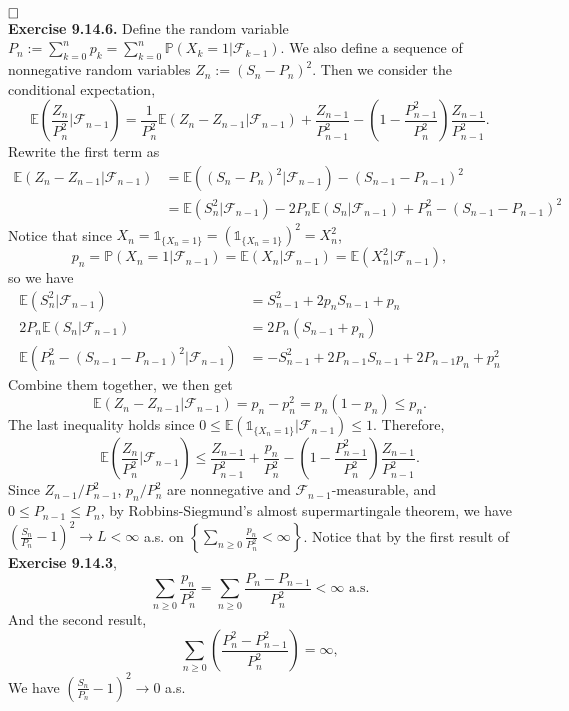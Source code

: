 \documentclass[12pt]{extarticle}
\begin{document}
$\hspace{\fill}\square$
\\
\textbf{Exercise 9.14.6.} 
Define the random variable $P_n:=\sum_{k=0}^np_k=\sum_{k=0}^n\mathbb{P}(X_k=1|\mathcal{F}_{k-1})$.
We also define a sequence of nonnegative random variables $Z_n:=(S_n-P_n)^2$.
Then we consider the conditional expectation, 
\[
\mathbb{E}\left(\frac{Z_n}{P_n^2}\bigg|\mathcal{F}_{n-1}\right)
=
\frac{1}{P_n^2}\mathbb{E}(Z_n-Z_{n-1}|\mathcal{F}_{n-1})
+
\frac{Z_{n-1}}{P_{n-1}^2}
-
\left(1-\frac{P_{n-1}^2}{P_n^2}\right)\frac{Z_{n-1}}{P_{n-1}^2}.
\]
Rewrite the first term as
\[
\begin{aligned}
\mathbb{E}(Z_n-Z_{n-1}|\mathcal{F}_{n-1})
&=
\mathbb{E}\left((S_n-P_n)^2|\mathcal{F}_{n-1}\right)-(S_{n-1}-P_{n-1})^2
\\&=
\mathbb{E}(S_n^2|\mathcal{F}_{n-1})-2P_n\mathbb{E}(S_n|\mathcal{F}_{n-1})+P_n^2-(S_{n-1}-P_{n-1})^2
\end{aligned}
\]
Notice that since $X_n=\mathds{1}_{\{X_n=1\}}=(\mathds{1}_{\{X_n=1\}})^2=X_n^2$,
\[
p_n
=
\mathbb{P}(X_n=1|\mathcal{F}_{n-1})
=
\mathbb{E}(X_n|\mathcal{F}_{n-1})
=
\mathbb{E}(X_n^2|\mathcal{F}_{n-1}),
\] 
so we have
\[
\begin{aligned}
\mathbb{E}(S_n^2|\mathcal{F}_{n-1})&=S_{n-1}^2+2p_nS_{n-1}+p_n
\\
2P_n\mathbb{E}(S_n|\mathcal{F}_{n-1})&=2P_n(S_{n-1}+p_n)
\\
\mathbb{E}\left(P_n^2-(S_{n-1}-P_{n-1})^2|\mathcal{F}_{n-1}\right)
&=
-S_{n-1}^2+2P_{n-1}S_{n-1}+2P_{n-1}p_n+p_n^2
\end{aligned}
\]
Combine them together, we then get
\[
\mathbb{E}(Z_n-Z_{n-1}|\mathcal{F}_{n-1})
=p_n-p_n^2=p_n(1-p_n)\leq p_n.
\]
The last inequality holds since $0\leq\mathbb{E}(\mathds{1}_{\{X_n=1\}}|\mathcal{F}_{n-1})\leq 1$.
Therefore,
\[
\mathbb{E}\left(\frac{Z_n}{P_n^2}\bigg|\mathcal{F}_{n-1}\right)
\leq
\frac{Z_{n-1}}{P_{n-1}^2}
+
\frac{p_n}{P_n^2}
-
\left(1-\frac{P_{n-1}^2}{P_n^2}\right)\frac{Z_{n-1}}{P_{n-1}^2}.
\]
Since $Z_{n-1}/P_{n-1}^2$, $p_n/P_n^2$ are nonnegative and $\mathcal{F}_{n-1}$-measurable, and $0\leq P_{n-1}\leq P_{n}$, by Robbins-Siegmund's almost supermartingale theorem, we have $\left(\frac{S_n}{P_n}-1\right)^2\rightarrow L<\infty$ a.s. on $\left\{\sum_{n\geq 0}\frac{p_n}{P_n^2}<\infty\right\}$.
Notice that by the first result of \textbf{Exercise 9.14.3},
\[
\sum_{n\geq 0}\frac{p_n}{P_n^2}=\sum_{n\geq 0}\frac{P_n-P_{n-1}}{P_n^2}<\infty \text{ a.s.}
\]
And the second result,
\[
\sum_{n\geq 0}\left(\frac{P_n^2-P_{n-1}^2}{P_n^2}\right)=\infty,
\]
We have $\left(\frac{S_n}{P_n}-1\right)^2\rightarrow 0$ a.s.
\end{document}
